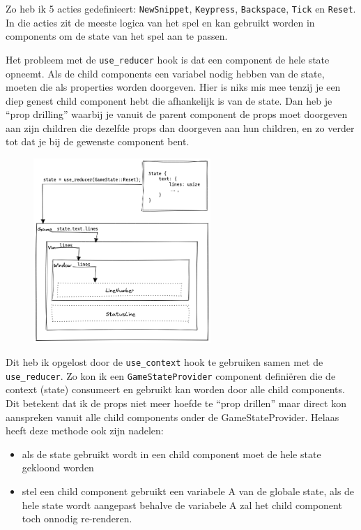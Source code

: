 Zo heb ik 5 acties gedefinieert: \texttt{NewSnippet}, \texttt{Keypress},
\texttt{Backspace}, \texttt{Tick} en \texttt{Reset}. In die acties zit
de meeste logica van het spel en kan gebruikt worden in components om de state van het spel aan te
passen. 

Het probleem met de \texttt{use_reducer} hook is dat een component de hele state opneemt.
Als de child components een variabel nodig hebben van de state, moeten die als properties worden
doorgeven. Hier is niks mis mee tenzij je een diep genest child component hebt die afhankelijk is
van de state. Dan heb je “prop drilling” waarbij je vanuit de parent component de props moet
doorgeven aan zijn children die dezelfde props dan doorgeven aan hun children, en zo verder tot dat
je bij de gewenste component bent.

\clearpage

\begin{figure}[h]
  \centering
  \includegraphics[width=0.6\textwidth]{./figures/use_reducer.png}
\end{figure}


Dit heb ik opgelost door de \texttt{use_context} hook te gebruiken samen met de
\texttt{use_reducer}. Zo kon ik een \texttt{GameStateProvider} component
definiëren die de context (state) consumeert en gebruikt kan worden door alle child components. Dit
betekent dat ik de props niet meer hoefde te “prop drillen” maar direct kon aanspreken vanuit alle
child components onder de GameStateProvider. Helaas heeft deze methode ook zijn nadelen: 
\begin{itemize}
    \item als de state gebruikt wordt in een child component moet de hele state gekloond worden 

    \item stel een child component gebruikt een variabele A van de globale state, als de hele state
    wordt aangepast behalve de variabele A zal het child component toch onnodig re-renderen. 
\end{itemize}

